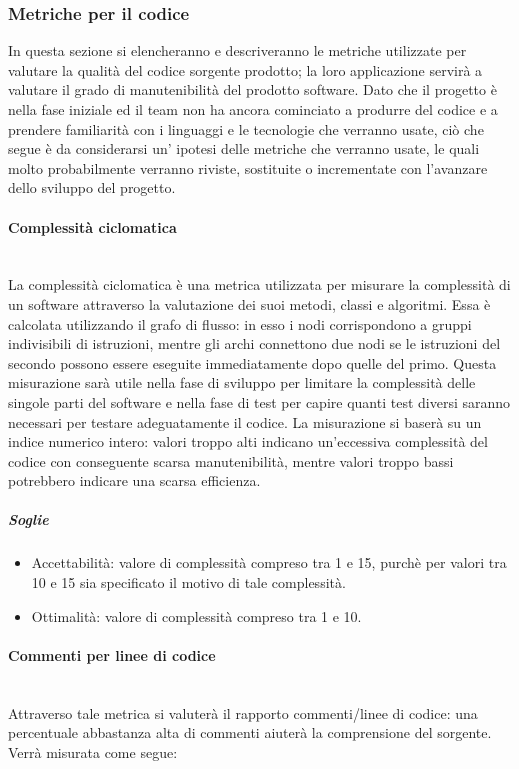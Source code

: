 \subsubsection{Metriche per il codice}
\label{AppB:metricheCod}
In questa sezione si elencheranno e descriveranno le metriche utilizzate per valutare la qualità del codice sorgente prodotto; la loro applicazione servirà a valutare il grado di manutenibilità del prodotto software. Dato che il progetto è nella fase iniziale ed il team non ha ancora cominciato a produrre del codice e a prendere familiarità con i linguaggi e le tecnologie che verranno usate, ciò che segue è da considerarsi un' ipotesi delle metriche che verranno usate, le quali molto probabilmente verranno riviste, sostituite o incrementate con l'avanzare dello sviluppo del progetto.

\paragraph{Complessità ciclomatica}
	~\\La complessità ciclomatica è una metrica utilizzata per misurare la complessità di un software attraverso la valutazione dei suoi metodi, classi e algoritmi. Essa è calcolata utilizzando il grafo di flusso: in esso i nodi corrispondono a gruppi indivisibili di istruzioni, mentre gli archi connettono due nodi se le istruzioni del secondo possono essere eseguite immediatamente dopo quelle del primo.
Questa misurazione sarà utile nella fase di sviluppo per limitare la complessità delle singole parti del software e nella fase di test per capire quanti test diversi saranno necessari per testare adeguatamente il codice.
La misurazione si baserà su un indice numerico intero: valori troppo alti indicano un'eccessiva complessità del codice con conseguente scarsa manutenibilità, mentre valori troppo bassi potrebbero indicare una scarsa efficienza.

\subparagraph{Soglie}
	\begin{itemize}
	\item Accettabilità: valore di complessità compreso tra 1 e 15, purchè per valori tra 10 e 15 sia specificato il motivo di tale complessità.
 	\item Ottimalità: valore di complessità compreso tra 1 e 10.
	\end{itemize}

\paragraph{Commenti per linee di codice}
	~\\Attraverso tale metrica si valuterà il rapporto commenti/linee di codice: una percentuale abbastanza alta di commenti aiuterà la comprensione del sorgente. Verrà misurata come segue:


